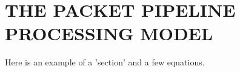 \chapter{THE PACKET PIPELINE PROCESSING MODEL} \label{pipeline_model}

Here is an example of a 'section' and a few equations.
